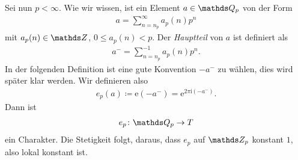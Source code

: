 Sei nun $p<\infty$. Wie wir wissen, ist ein Element $a\in \Q_p$ von der Form
\begin{align*}
a=\sum_{n=n_p}^\infty a_p(n)p^n
\end{align*}
mit $a_p(n)\in \Z$, $0\leq a_p(n)<p$.
Der  \emph{Hauptteil} von $a$ ist definiert als
\begin{align*}
a^-=\sum_{n=n_p}^{-1} a_p(n)p^n.
\end{align*}
In der folgenden Definition ist eine gute Konvention $-a^-$ zu wählen, dies wird später klar werden.
Wir definieren also
\begin{align*}
e_p(a)\coloneqq  \mathrm{e}(-a^-)=\mathrm{e}^{2\pi \mathrm{i}(-a^-)}.
\end{align*}
Dann ist
\begin{align*}
e_p \colon \Q_p \to T
\end{align*}
ein Charakter. Die Stetigkeit folgt, daraus, dass $e_p$ auf $\Z_p$ konstant $1$, also lokal konstant ist.

